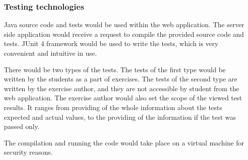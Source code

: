 \subsubsection{Testing technologies}
Java source code and tests would be used within the web application. The server side application would receive a request to compile the provided source code and tests. JUnit 4 framework would be used to write the tests, which is very convenient and intuitive in use. 

There would be two types of the tests. The tests of the first type would be written by the students as a part of exercises. The tests of the second type are written by the exercise author, and they are not accessible by student from the web application. The exercise author would also set the scope of the viewed test results. It ranges from providing of the whole information about the tests expected and actual values, to the providing of the information if the test was passed only.

The compilation and running the code would take place on a virtual machine for security reasons.